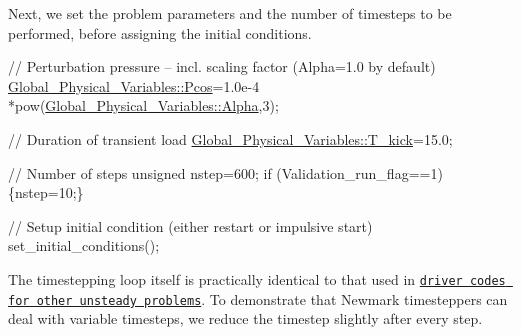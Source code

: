 

Next, we set the problem parameters and the number of timesteps to be performed, before assigning the initial conditions.


\begin{DoxyCodeInclude}

 \textcolor{comment}{// Perturbation pressure -- incl. scaling factor (Alpha=1.0 by default)}
 \hyperlink{namespaceGlobal__Physical__Variables_ab55734aaa66260cd9d4bf68a4ecafdd5}{Global\_Physical\_Variables::Pcos}=1.0e-4
  *pow(\hyperlink{namespaceGlobal__Physical__Variables_aa2e802ee7cc8e1ac900ba94c3ce86eb7}{Global\_Physical\_Variables::Alpha},3); 

 \textcolor{comment}{// Duration of transient load}
 \hyperlink{namespaceGlobal__Physical__Variables_a8a2c0589daf61085e7ebec410cbbbc76}{Global\_Physical\_Variables::T\_kick}=15.0;

 \textcolor{comment}{// Number of steps}
 \textcolor{keywordtype}{unsigned} nstep=600; 
 \textcolor{keywordflow}{if} (Validation\_run\_flag==1) \{nstep=10;\}

 \textcolor{comment}{// Setup initial condition (either restart or impulsive start)}
 set\_initial\_conditions();

\end{DoxyCodeInclude}


The timestepping loop itself is practically identical to that used in \href{../../../unsteady_heat/two_d_unsteady_heat/html/index.html#main}{\tt driver codes for other unsteady problems}. To demonstrate that {\ttfamily Newmark} timesteppers can deal with variable timesteps, we reduce the timestep slightly after every step.


